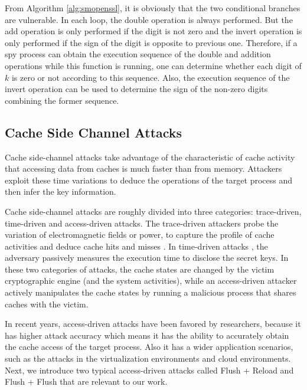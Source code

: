 From Algorithm \ref{alg:smopenssl}, it is obviously that the two conditional branches are vulnerable.
In each loop, the double operation is always performed.
But the add operation is only performed if the digit is not zero and the invert operation is only performed if the sign of the digit is opposite to previous one.
Therefore, if a spy process can obtain the execution sequence of
  the double and addition operations while this function is running,
one can determine whether each digit of $k$ is zero or not according to this sequence.
Also,  the execution sequence of the invert operation can be used to determine the sign of the non-zero digits combining the former sequence.



\subsection{Cache Side Channel Attacks}
\label{intro_cacheattack}
Cache side-channel attacks take advantage of the characteristic of cache activity
 that accessing data from caches is much faster than from memory.
Attackers exploit these time variations to deduce the operations of the target process and then infer the key information.

Cache side-channel attacks are roughly divided into three categories: trace-driven, time-driven and access-driven attacks.
The trace-driven attackers probe the variation of electromagnetic fields or power, to capture the profile of cache activities and deduce cache hits and misses \cite{ac2006}.
In time-driven attacks \cite{Bonneau2006, Bernstein2005Cache}, the adversary passively measures the execution time to disclose the secret keys.
In these two categories of attacks, the cache states are changed by the victim cryptographic engine (and the system activities),
 while an access-driven attacker \cite{Osvik2006, cachegame2011, flushreload} actively manipulates the cache states by running a malicious process that shares caches with the victim.

In recent years, access-driven attacks have been favored by researchers,
 because it has higher attack accuracy which means it has the ability to accurately obtain the cache access of the target process.
Also it has a wider application scenarios, such as the attacks in the virtualization environments and cloud environments.
Next, we introduce two typical access-driven attacks called Flush + Reload \cite{flushreload} and Flush + Flush \cite{gruss2016flush} that are relevant to our work.

